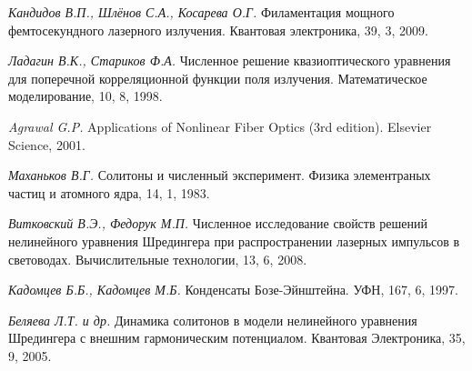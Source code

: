 \documentclass[12pt,a4paper,twoside]{article}
\begin{document}

    

    

    

    

    

    

    \begin{thebibliography}{99}
        \textit{Кандидов В.П., Шлёнов С.А., Косарева О.Г.}
        Филаментация мощного фемтосекундного лазерного излучения.
        Квантовая электроника, 39, 3, 2009.

        \textit{Ладагин В.К., Стариков Ф.А.}
        Численное решение квазиоптического уравнения для поперечной корреляционной функции поля излучения.
        Математическое моделирование, 10, 8, 1998.

        \textit{Agrawal G.P.}
        Applications of Nonlinear Fiber Optics (3rd edition).
        Elsevier Science, 2001.

        \textit{Маханьков В.Г.}
        Солитоны и численный эксперимент.
        Физика элементраных частиц и атомного ядра, 14, 1, 1983.

        \textit{Витковский В.Э., Федорук М.П.}
        Численное исследование свойств решений нелинейного уравнения Шредингера при распространении лазерных импульсов в световодах.
        Вычислительные технологии, 13, 6, 2008.

        \textit{Кадомцев Б.Б., Кадомцев М.Б.}
        Конденсаты Бозе-Эйнштейна.
        УФН, 167, 6, 1997.

        \textit{Беляева Л.Т. и др.}
        Динамика солитонов в модели нелинейного уравнения Шредингера с внешним гармоническим потенциалом.
        Квантовая Электроника, 35, 9, 2005.


\end{thebibliography}
\end{document}
